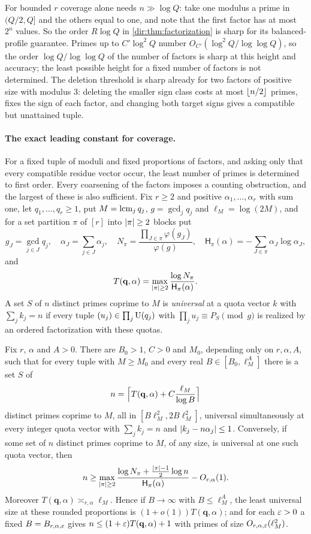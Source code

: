 For bounded $r$ coverage alone needs $n\gg\log Q$: take one modulus a prime in $(Q/2,Q]$ and the
others equal to one, and note that the first factor has at most $2^n$ values. So the order
$R\log Q$ in \cref{dir:thm:factorization} is sharp for its balanced-profile guarantee. Primes up
to $C'\log^2Q$ number $O_{C'}(\log^2Q/\log\log Q)$, so the order $\log Q/\log\log Q$ of the
number of factors is sharp at this height and accuracy; the least possible height for a fixed
number of factors is not determined. The deletion threshold is sharp already for two factors of
positive size with modulus $3$: deleting the smaller sign class costs at most $\lfloor n/2\rfloor$
primes, fixes the sign of each factor, and changing both target signs gives a compatible but
unattained tuple.

\paragraph{The exact leading constant for coverage.}
For a fixed tuple of moduli and fixed proportions of factors, and asking only that every compatible
residue vector occur, the least number of primes is determined to first order. Every coarsening of
the factors imposes a counting obstruction, and the largest of these is also sufficient. Fix $r\ge2$
and positive $\alpha_1,\dots,\alpha_r$ with sum one, let $q_1,\dots,q_r\ge1$, put
$M=\operatorname{lcm}_jq_j$, $g=\gcd_jq_j$ and $\ell_M=\log(2M)$, and for a set partition $\pi$ of $[r]$ into
$\lvert\pi\rvert\ge2$ blocks put
\[
 g_J=\gcd_{j\in J}q_j,\quad\alpha_J=\sum_{j\in J}\alpha_j,\quad
 N_\pi=\frac{\prod_{J\in\pi}\varphi(g_J)}{\varphi(g)},\quad
 \mathsf H_\pi(\alpha)=-\sum_{J\in\pi}\alpha_J\log\alpha_J,
\]
and
\[
 T(\mathbf q,\alpha)=\max_{\lvert\pi\rvert\ge2}\frac{\log N_\pi}{\mathsf H_\pi(\alpha)} .
\]
A set $S$ of $n$ distinct primes coprime to $M$ is \emph{universal} at a quota vector $k$ with
$\sum_jk_j=n$ if every tuple $(u_j)\in\prod_j\mathrm{U}(q_j)$ with $\prod_ju_j\equiv P_S\pmod g$ is realized
by an ordered factorization with these quotas.

\begin{theorem}\label{dir:thm:entropy}
Fix $r$, $\alpha$ and $A>0$. There are $B_0>1$, $C>0$ and $M_0$, depending only on $r,\alpha,A$, such
that for every tuple with $M\ge M_0$ and every real $B\in[B_0,\ell_M^A]$ there is a set $S$ of
\[
 n=\Bigl\lceil T(\mathbf q,\alpha)+C\frac{\ell_M}{\log B}\Bigr\rceil
\]
distinct primes coprime to $M$, all in $[B\ell_M^2,2B\ell_M^2]$, universal simultaneously at every integer
quota vector with $\sum_jk_j=n$ and $\lvert k_j-n\alpha_j\rvert\le1$. Conversely, if some set of $n$ distinct
primes coprime to $M$, of any size, is universal at one such quota vector, then
\[
 n\ge\max_{\lvert\pi\rvert\ge2}\frac{\log N_\pi+\frac{\lvert\pi\rvert-1}2\log n}{\mathsf H_\pi(\alpha)}-O_{r,\alpha}(1).
\]
Moreover $T(\mathbf q,\alpha)\asymp_{r,\alpha}\ell_M$. Hence if $B\to\infty$ with $B\le\ell_M^A$, the least
universal size at these rounded proportions is $(1+o(1))T(\mathbf q,\alpha)$; and for each $\varepsilon>0$ a fixed
$B=B_{r,\alpha,\varepsilon}$ gives $n\le(1+\varepsilon)T(\mathbf q,\alpha)+1$ with primes of size $O_{r,\alpha,\varepsilon}(\ell_M^2)$.
\end{theorem}

